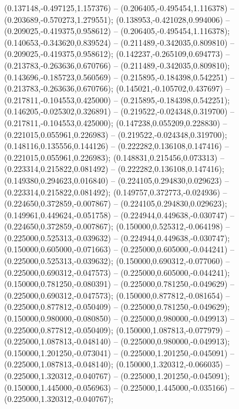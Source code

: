  (0.137148,-0.497125,1.157376) -- (0.206405,-0.495454,1.116378) -- (0.203689,-0.570273,1.279551);
 (0.138953,-0.421028,0.994006) -- (0.209025,-0.419375,0.958612) -- (0.206405,-0.495454,1.116378);
 (0.140653,-0.343620,0.839524) -- (0.211489,-0.342035,0.809810) -- (0.209025,-0.419375,0.958612);
 (0.142237,-0.265109,0.694773) -- (0.213783,-0.263636,0.670766) -- (0.211489,-0.342035,0.809810);
 (0.143696,-0.185723,0.560569) -- (0.215895,-0.184398,0.542251) -- (0.213783,-0.263636,0.670766);
 (0.145021,-0.105702,0.437697) -- (0.217811,-0.104553,0.425000) -- (0.215895,-0.184398,0.542251);
 (0.146205,-0.025302,0.326891) -- (0.219522,-0.024348,0.319700) -- (0.217811,-0.104553,0.425000);
 (0.147238,0.055209,0.228830) -- (0.221015,0.055961,0.226983) -- (0.219522,-0.024348,0.319700);
 (0.148116,0.135556,0.144126) -- (0.222282,0.136108,0.147416) -- (0.221015,0.055961,0.226983);
 (0.148831,0.215456,0.073313) -- (0.223314,0.215822,0.081492) -- (0.222282,0.136108,0.147416);
 (0.149380,0.294623,0.016840) -- (0.224105,0.294830,0.029623) -- (0.223314,0.215822,0.081492);
 (0.149757,0.372773,-0.024936) -- (0.224650,0.372859,-0.007867) -- (0.224105,0.294830,0.029623);
 (0.149961,0.449624,-0.051758) -- (0.224944,0.449638,-0.030747) -- (0.224650,0.372859,-0.007867);
 (0.150000,0.525312,-0.064198) -- (0.225000,0.525313,-0.039632) -- (0.224944,0.449638,-0.030747);
 (0.150000,0.605000,-0.071663) -- (0.225000,0.605000,-0.044241) -- (0.225000,0.525313,-0.039632);
 (0.150000,0.690312,-0.077060) -- (0.225000,0.690312,-0.047573) -- (0.225000,0.605000,-0.044241);
 (0.150000,0.781250,-0.080391) -- (0.225000,0.781250,-0.049629) -- (0.225000,0.690312,-0.047573);
 (0.150000,0.877812,-0.081654) -- (0.225000,0.877812,-0.050409) -- (0.225000,0.781250,-0.049629);
 (0.150000,0.980000,-0.080850) -- (0.225000,0.980000,-0.049913) -- (0.225000,0.877812,-0.050409);
 (0.150000,1.087813,-0.077979) -- (0.225000,1.087813,-0.048140) -- (0.225000,0.980000,-0.049913);
 (0.150000,1.201250,-0.073041) -- (0.225000,1.201250,-0.045091) -- (0.225000,1.087813,-0.048140);
 (0.150000,1.320312,-0.066035) -- (0.225000,1.320312,-0.040767) -- (0.225000,1.201250,-0.045091);
 (0.150000,1.445000,-0.056963) -- (0.225000,1.445000,-0.035166) -- (0.225000,1.320312,-0.040767);

